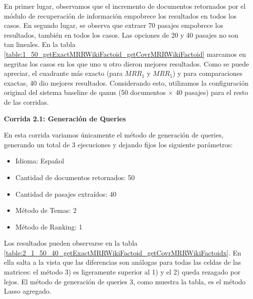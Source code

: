 En primer lugar, observamos que el incremento de documentos retornados por el módulo de recuperación de información empobrece los resultados en todos los casos.
En segundo lugar, se observa que extraer 70 pasajes empobrece los resultados, también en todos los casos. Las opciones de 20 y 40 pasajes no son tan lineales. En la tabla \ref{table:1_50_getExactMRRWikiFactoid_getCovrMRRWikiFactoid} marcamos en negritas los casos en los que uno u otro dieron mejores resultados. Como se puede apreciar, el cuadrante más exacto (para $MRR_{1}$ y $MRR_{5}$) y para comparaciones exactas, 40 dio mejores resultados. Considerando esto, utilizamos la configuración original del sistema baseline de qanus (50 documentos $\times$ 40 pasajes) para el resto de las corridas. \newline


\textbf{Corrida 2.1: Generación de Queries}\newline

En esta corrida variamos únicamente el método de generación de queries, generando un total de 3 ejecuciones y dejando fijos los siguiente parámetros: \newline

\begin{itemize}
  \item Idioma: Español
  \item Cantidad de documentos retornados: 50
  \item Cantidad de pasajes extraídos: 40
  \item Método de Temas: 2
  \item Método de Ranking: 1
\end{itemize}

Los resultados pueden observarse en la tabla \ref{table:2_1_50_40_getExactMRRWikiFactoid_getCovrMRRWikiFactoidx}. En ella salta a la vista que las diferencias son análogas para todas las celdas de las matrices: el método 3) es ligeramente superior al 1) y el 2) queda rezagado por lejos.
El método de generación de queries 3, como muestra la tabla, es el método Lasso agregado.\newline


